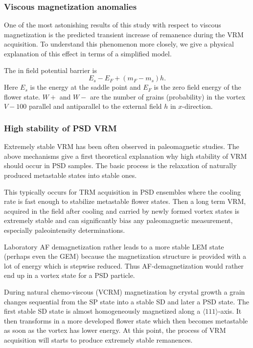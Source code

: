 \subsubsection{Viscous magnetization anomalies}
One of the most astonishing results of this study with respect to viscous magnetization is the predicted transient
increase of remanence during
the VRM acquisition. To understand this phenomenon more closely, we
give a physical explanation of this effect in terms of a simplified model.


The in field potential barrier is
\begin{equation}
E_s - E_F + (m_F - m_s) h.
\end{equation}
Here $E_s$ is the energy at the saddle point and $E_F$ is the zero field
energy of the flower state.
$W+$ and $W-$ are the number of grains (probability) in the vortex $V-100$
parallel and antiparallel to the external field $h$ in $x$-direction.

\subsubsection{High stability of PSD VRM}
Extremely stable VRM has been often observed in paleomagnetic studies.
The above mechanisms give a first theoretical explanation why
high stability of VRM should occur in PSD samples.
The basic process is the relaxation of naturally produced
metastable states into stable ones.

This typically occurs for TRM acquisition in PSD ensembles where the cooling rate is fast enough to
stabilize metastable flower states.
Then a long term VRM, acquired in the field after cooling and carried by newly formed
 vortex states is extremely
stable and can significantly bias any paleomagnetic measurement, especially paleointensity determinations.


Laboratory AF demagnetization  rather leads to a more stable
LEM state (perhaps even the GEM) because the magnetization structure is
provided with a lot of energy which is stepwise reduced.
Thus AF-demagnetization would rather end up in a vortex state for a PSD particle.

During natural chemo-viscous (VCRM) magnetization by crystal growth a grain
changes sequential from the  SP state into a stable SD and later a PSD state.
The first stable SD state is almost homogeneously magnetized along a $\langle 111\rangle$-axis.
It then transforms in a more developed flower state which then
becomes metastable as soon as the vortex has lower energy.
At this point,  the process of VRM acquisition will starts to
produce extremely stable remanences.
